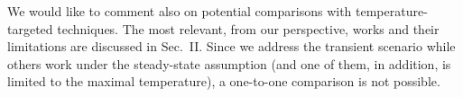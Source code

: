 \begin{authors}
We would like to comment also on potential comparisons with temperature-targeted techniques.
The most relevant, from our perspective, works and their limitations are discussed in Sec.~II.
Since we address the transient scenario while others work under the steady-state assumption (and one of them, in addition, is limited to the maximal temperature), a one-to-one comparison is not possible.

\end{authors}
